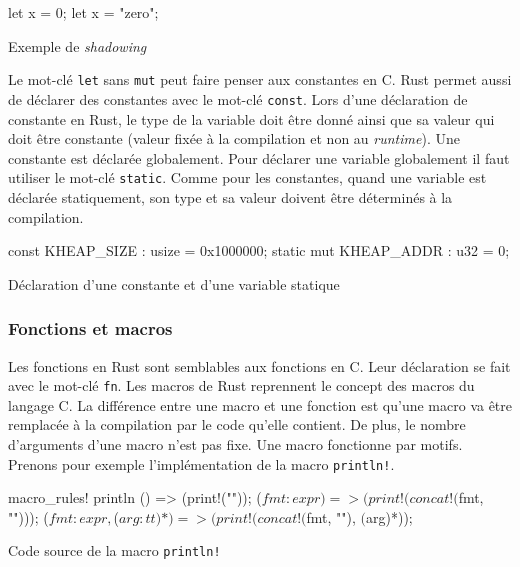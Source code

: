 \begin{code}
\begin{rustcode}
let x = 0;
let x = "zero";
\end{rustcode}
\caption{Exemple de \textit{shadowing}}
\label{lst:rust:var3}
\end{code} \bigbreak

Le mot-clé \texttt{let} sans \texttt{mut} peut faire penser
aux constantes en C. Rust permet aussi de déclarer des constantes avec le mot-clé
\texttt{const}. Lors d'une déclaration de constante en Rust, le type
de la variable doit être donné ainsi que sa valeur qui doit être constante (valeur
fixée à la compilation et non au \textit{runtime}). Une constante est déclarée
globalement. Pour déclarer une variable globalement il faut utiliser le mot-clé
\texttt{static}. Comme pour les constantes, quand une variable est déclarée
statiquement, son type et sa valeur doivent être déterminés à la compilation.

\begin{code}
\begin{rustcode}
const KHEAP_SIZE        : usize = 0x1000000;
static mut KHEAP_ADDR   : u32   = 0;
\end{rustcode}
\caption{Déclaration d'une constante et d'une variable statique}
\label{lst:rust:var4}
\end{code} \bigbreak


\subsubsection{Fonctions et macros}
Les fonctions en Rust sont semblables aux fonctions en C. Leur déclaration se fait
avec le mot-clé \texttt{fn}. Les macros de Rust reprennent le concept
des macros du langage C. La différence entre une macro et une fonction est qu'une
macro va être remplacée à la compilation par le code qu'elle contient. De plus,
le nombre d'arguments d'une macro n'est pas fixe. Une macro fonctionne par motifs.
Prenons pour exemple l'implémentation de la macro \texttt{println!}. \\

\begin{code}
\begin{rustcode}
macro_rules! println {
    () => (print!("\n"));
    ($fmt:expr) => (print!(concat!($fmt, "\n")));
    ($fmt:expr, $($arg:tt)*) => (print!(concat!($fmt, "\n"), $($arg)*));
}
\end{rustcode}
\caption{Code source de la macro \texttt{println!}}
\label{lst:rust:macro}
\end{code} \bigbreak

